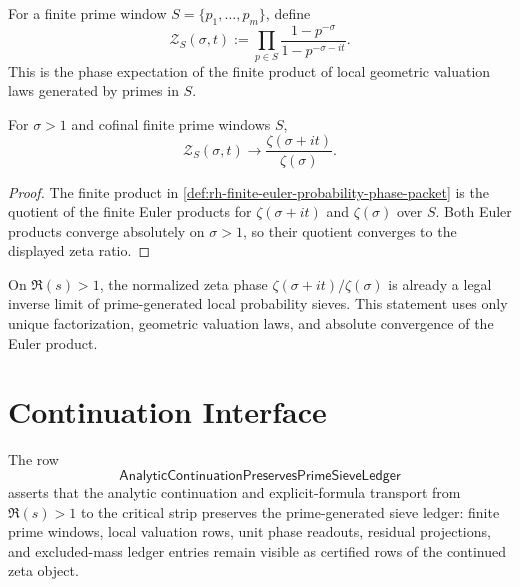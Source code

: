 \begin{definition}
\label{def:rh-finite-euler-probability-phase-packet}
For a finite prime window $S=\{p_1,\ldots,p_m\}$, define
$$
\mathcal Z_S(\sigma,t)
:=
\prod_{p\in S}
\frac{1-p^{-\sigma}}{1-p^{-\sigma-it}}.
$$
This is the phase expectation of the finite product of local geometric
valuation laws generated by primes in $S$.
\end{definition}

\begin{theorem}
\label{thm:rh-finite-euler-packets-converge-zeta-phase-readout}
For $\sigma>1$ and cofinal finite prime windows $S$,
$$
\mathcal Z_S(\sigma,t)
\to
\frac{\zeta(\sigma+it)}{\zeta(\sigma)}.
$$
\end{theorem}

\begin{proof}
The finite product in
\autoref{def:rh-finite-euler-probability-phase-packet} is the quotient
of the finite Euler products for $\zeta(\sigma+it)$ and
$\zeta(\sigma)$ over $S$.  Both Euler products converge absolutely on
$\sigma>1$, so their quotient converges to the displayed zeta ratio.
\end{proof}

\begin{principle}
\label{prin:rh-right-half-plane-zeta-prime-generated-phase-limit}
On $\Re(s)>1$, the normalized zeta phase
$\zeta(\sigma+it)/\zeta(\sigma)$ is already a legal inverse limit of
prime-generated local probability sieves.  This statement uses only
unique factorization, geometric valuation laws, and absolute
convergence of the Euler product.
\end{principle}

\section{Continuation Interface}
\label{sec:rh-prime-generated-recursive-continuation-interface}

\begin{definition}[AnalyticContinuationPreservesPrimeSieveLedger]
\label{def:rh-analytic-continuation-preserves-prime-sieve-ledger}
The row
$$
\mathsf{AnalyticContinuationPreservesPrimeSieveLedger}
$$
asserts that the analytic continuation and explicit-formula transport
from $\Re(s)>1$ to the critical strip preserves the prime-generated
sieve ledger: finite prime windows, local valuation rows, unit phase
readouts, residual projections, and excluded-mass ledger entries remain
visible as certified rows of the continued zeta object.
\end{definition}


